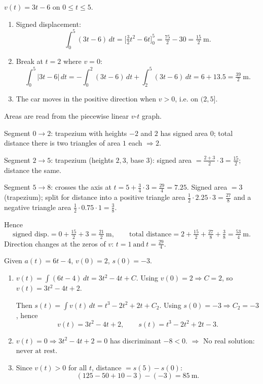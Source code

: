 \documentclass[11pt]{article}
\begin{document}
\begin{solution}
\(v(t)=3t-6\) on \(0\le t\le 5\).
\begin{enumerate}
\item Signed displacement:
\[
\int_{0}^{5}(3t-6)\,dt=\Big[\tfrac{3}{2}t^{2}-6t\Big]_{0}^{5}
=\tfrac{75}{2}-30=\boxed{\tfrac{15}{2}\ \text{m}}.
\]
\item Break at \(t=2\) where \(v=0\):
\[
\int_{0}^{5}\!\!|3t-6|\,dt
=-\!\!\int_{0}^{2}\!(3t-6)\,dt+\!\!\int_{2}^{5}\!(3t-6)\,dt
=6+13.5=\boxed{\tfrac{39}{2}\ \text{m}}.
\]
\item The car moves in the positive direction when \(v>0\), i.e. on \(\boxed{(2,5]}\).
\end{enumerate}
\end{solution}

\begin{solution}
Areas are read from the piecewise linear \(v\)-\(t\) graph.

Segment \(0\to2\): trapezium with heights \(-2\) and \(2\) has signed area \(0\);
total distance there is two triangles of area \(1\) each \(\Rightarrow 2\).

Segment \(2\to5\): trapezium (heights \(2,3\), base \(3\)):
signed area \(=\frac{2+3}{2}\cdot3=\tfrac{15}{2}\); distance the same.

Segment \(5\to8\): crosses the axis at 
\(t=\displaystyle 5+\frac{3}{4}\cdot3=\boxed{\tfrac{29}{4}=7.25}\).
Signed area \(=3\) (trapezium); split for distance into 
a positive triangle area \(\tfrac12\cdot2.25\cdot3=\tfrac{27}{8}\)
and a negative triangle area \(\tfrac12\cdot0.75\cdot1=\tfrac{3}{8}\).

Hence
\[
\text{signed disp.}=0+\tfrac{15}{2}+3=\boxed{\tfrac{21}{2}\ \text{m}},
\qquad
\text{total distance}=2+\tfrac{15}{2}+\tfrac{27}{8}+\tfrac{3}{8}
=\boxed{\tfrac{53}{4}\ \text{m}}.
\]
Direction changes at the zeros of \(v\): \(\boxed{t=1\ \text{and}\ t=\tfrac{29}{4}}\).
\end{solution}

\begin{solution}
Given \(a(t)=6t-4\), \(v(0)=2\), \(s(0)=-3\).
\begin{enumerate}
\item \(v(t)=\int (6t-4)\,dt=3t^{2}-4t+C\).
Using \(v(0)=2\Rightarrow C=2\), so \(v(t)=3t^{2}-4t+2\).

Then \(s(t)=\int v(t)\,dt=t^{3}-2t^{2}+2t+C_2\).
Using \(s(0)=-3\Rightarrow C_2=-3\), hence
\[
\boxed{v(t)=3t^{2}-4t+2},\qquad \boxed{s(t)=t^{3}-2t^{2}+2t-3}.
\]
\item \(v(t)=0\Rightarrow 3t^{2}-4t+2=0\) has discriminant \(-8<0\).
\(\Rightarrow\) No real solution: \(\boxed{\text{never at rest}}\).
\item Since \(v(t)>0\) for all \(t\), distance \(=s(5)-s(0)\):
\[
(125-50+10-3)-(-3)=\boxed{85\ \text{m}}.
\]
\end{enumerate}
\end{solution}
\end{document}
